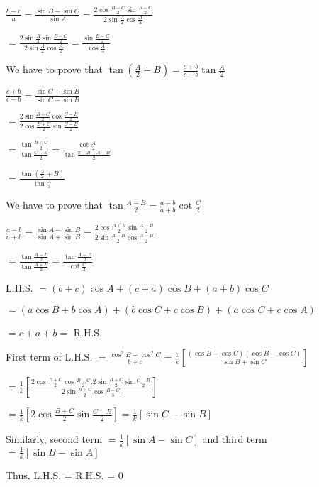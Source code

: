   $\frac{b - c}{a} = \frac{\sin B - \sin C}{\sin A} = \frac{2\cos\frac{B + C}{2}\sin \frac{B -
    C}{2}}{2\sin\frac{A}{2}\cos\frac{A}{2}}$

  $= \frac{2\sin\frac{A}{2}\sin\frac{B - C}{2}}{2\sin\frac{A}{2}\cos\frac{A}{2}} = \frac{\sin\frac{B - C}{2}}{\cos\frac{A}{3}}$

\item We have to prove that $\tan\left(\frac{A}{2} + B\right) = \frac{c + b}{c - b}\tan \frac{A}{2}$

  $\frac{c + b}{c - b} = \frac{\sin C + \sin B}{\sin C - \sin B}$

  $= \frac{2\sin\frac{B + C}{2}\cos\frac{C - B}{2}}{2\cos\frac{B + C}{2}\sin\frac{C - B}{2}}$

  $= \frac{\tan\frac{B + C}{2}}{\tan\frac{C - B}{2}} = \frac{\cot\frac{A}{2}}{\tan\frac{\pi - B - A - B}{2}}$

  $= \frac{\tan\left(\frac{A}{2} + B\right)}{\tan\frac{A}{3}}$

\item We have to prove that $\tan\frac{A - B}{2} = \frac{a - b}{a + b}\cot\frac{C}{2}$

  $\frac{a - b}{a + b} = \frac{\sin A - \sin B}{\sin A + \sin B} = \frac{2\cos\frac{A + B}{2}\sin\frac{A -
    B}{2}}{2\sin\frac{A + B}{2}\cos\frac{A - B}{2}}$

  $= \frac{\tan\frac{A - B}{2}}{\tan \frac{A + B}{2}} = \frac{\tan\frac{A - B}{2}}{\cot\frac{C}{2}}$

\item L.H.S. $= (b + c)\cos A + (c + a)\cos B + (a + b)\cos C$

  $= (a\cos B + b\cos A) + (b\cos C + c\cos B) + (a\cos C + c\cos A)$

  $= c + a + b =$ R.H.S.

\item First term of L.H.S. $= \frac{\cos^2B - \cos^2C}{b + c} = \frac{1}{k}\left[\frac{(\cos B + \cos C)(\cos B - \cos C)}{\sin
    B + \sin C}\right]$

  $= \frac{1}{k}\left[\frac{2\cos\frac{B+C}{2}\cos\frac{B - C}{2}.2\sin\frac{B + C}{2}\sin\frac{C - B}{2}}{2\sin\frac{B +
      C}{2}\cos\frac{B - C}{3}}\right]$

  $= \frac{1}{k}\left[2\cos\frac{B + C}{2}\sin\frac{C - B}{2}\right] = \frac{1}{k}[\sin C - \sin B]$

  Similarly, second term $= \frac{1}{k}[\sin A - \sin C]$ and third term $= \frac{1}{k}[\sin B - \sin A]$

  Thus, L.H.S. = R.H.S. = 0

